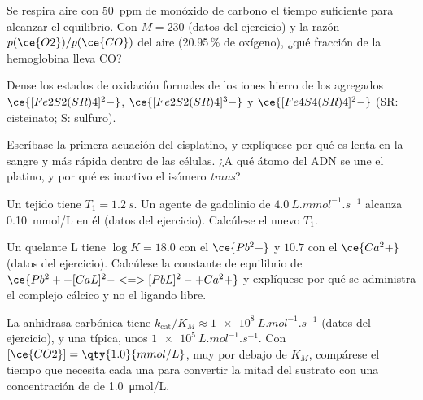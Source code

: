 \begin{exercise}[$\star\star$]\label{exo:b3:bioinorganic:6}
Se respira aire con \qty{50}{ppm} de monóxido de carbono el tiempo suficiente para alcanzar el
equilibrio. Con $M = 230$ (datos del ejercicio) y la razón $p(\ce{O2})/p(\ce{CO})$ del aire
(20.95\,\% de oxígeno), ¿qué fracción de la hemoglobina lleva CO?
\end{exercise}

\begin{exercise}[$\star\star$]\label{exo:b3:bioinorganic:7}
Dense los estados de oxidación formales de los iones hierro de los agregados $\ce{[Fe2S2(SR)4]^2-}$,
$\ce{[Fe2S2(SR)4]^3-}$ y $\ce{[Fe4S4(SR)4]^2-}$ (SR: cisteinato; S: sulfuro).
\end{exercise}

\begin{exercise}[$\star\star$]\label{exo:b3:bioinorganic:8}
Escríbase la primera acuación del cisplatino, y explíquese por qué es lenta en la sangre y
más rápida dentro de las células. ¿A qué átomo del ADN se une el platino, y por qué es inactivo el
isómero \textit{trans}?
\end{exercise}

\begin{exercise}[$\star\star$]\label{exo:b3:bioinorganic:9}
Un tejido tiene $T_1 = \qty{1.2}{s}$. Un agente de gadolinio de  $\qty{4.0}{L.mmol^{-1}.s^{-1}}$ alcanza \qty{0.10}{mmol/L}
en él (datos del ejercicio). Calcúlese el nuevo $T_1$.
\end{exercise}

\begin{exercise}[$\star\star\star$]\label{exo:b3:bioinorganic:10}
Un quelante L tiene $\log K = 18.0$ con el $\ce{Pb^2+}$ y $10.7$ con el $\ce{Ca^2+}$ (datos del ejercicio).
Calcúlese la constante de equilibrio de $\ce{Pb^2+ + [CaL]^2- <=> [PbL]^2- + Ca^2+}$ y explíquese por qué se administra el complejo
cálcico y no el ligando libre.
\end{exercise}

\begin{exercise}[$\star\star\star$]\label{exo:b3:bioinorganic:11}
La anhidrasa carbónica tiene $k_{\mathrm{cat}}/K_M \approx \qty{1e8}{L.mol^{-1}.s^{-1}}$ (datos del ejercicio), y una  típica, unos
$\qty{1e5}{L.mol^{-1}.s^{-1}}$. Con $[\ce{CO2}] = \qty{1.0}{mmol/L}$, muy por debajo de $K_M$, compárese el tiempo que necesita cada una para convertir la mitad
del sustrato con una concentración de  de \qty{1.0}{\micro mol/L}.
\end{exercise}

